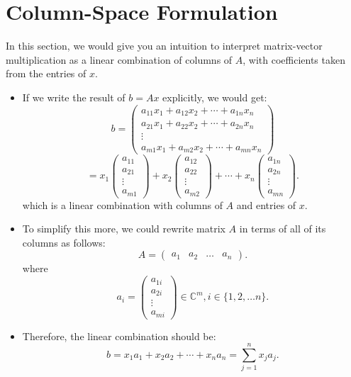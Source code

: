 \section{Column-Space Formulation}
In this section, we would give you an intuition to interpret matrix-vector multiplication as a linear combination of columns of $A$, with coefficients taken from the entries of $x$.
 \begin{itemize}
\item If we write the result of $b = Ax$ explicitly, we would get:
\[
b = \begin{pmatrix} a_{11}x_1 + a_{12}x_2 + \cdots + a_{1n}x_n \\  a_{21}x_1 + a_{22}x_2 + \cdots + a_{2n}x_n\\ \vdots\\a_{m1}x_1 + a_{m2}x_2 + \cdots + a_{mn}x_n \end{pmatrix}
\]
\[
 = x_1\begin{pmatrix} a_{11}\\ a_{21} \\ \vdots\\ a_{m1} \end{pmatrix} + x_2 
\begin{pmatrix} a_{12}\\ a_{22} \\ \vdots\\ a_{m2} \end{pmatrix} + \cdots + x_n 
\begin{pmatrix} a_{1n}\\ a_{2n} \\ \vdots\\ a_{mn} \end{pmatrix}
.\]
which is a linear combination with columns of $A$ and entries of $x$.
 \item To simplify this more, we could rewrite matrix $A$ in terms of all of its columns as follows:
    \[
   A = \begin{pmatrix}
     a_1 & a_2 & \ldots & a_n
   \end{pmatrix}
   .\]
   where
   \[
   a_i = \begin{pmatrix} a_{1i}\\ a_{2i} \\  \vdots\\ a_{mi} \end{pmatrix} \in \mathbb{C}^{m}, i \in \{1, 2, \ldots n\} 
   .\]
  \item Therefore, the linear combination should be:
     \[
    b = x_1a_1 + x_2a_2 + \cdots + x_na_n = \sum_{j=1}^{n} x_j a_j
    .\] 
\end{itemize}
